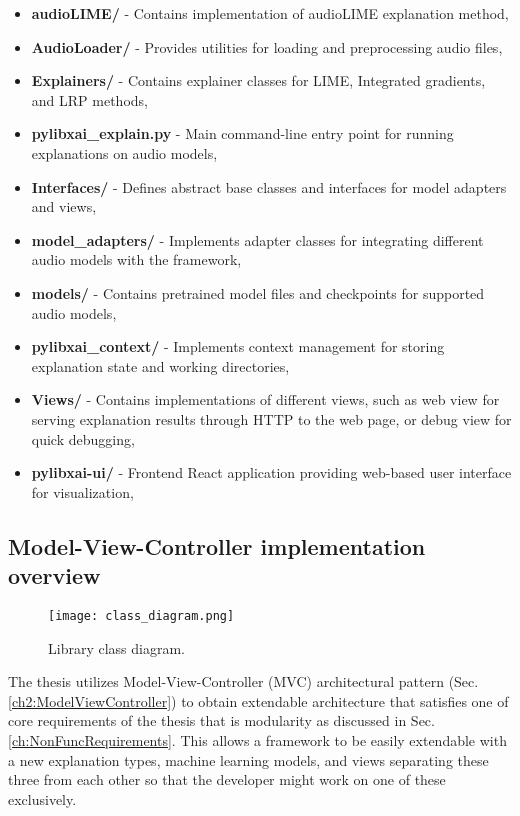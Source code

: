 \documentclass[
    bindingoffset=5mm,  %
    footnoteindent=3mm, %
    hyphenation=true    %
]{src/wut-thesis}
\begin{document}
\begin{itemize}[itemsep=1\baselineskip]
	\item \textbf{audioLIME/} - Contains implementation of audioLIME explanation method,
	\item \textbf{AudioLoader/} - Provides utilities for loading and preprocessing audio files,
	\item \textbf{Explainers/} - Contains explainer classes for LIME, Integrated gradients, and LRP methods,
	\item \textbf{pylibxai\_explain.py} - Main command-line entry point for running explanations on audio models,
	\item \textbf{Interfaces/} - Defines abstract base classes and interfaces for model adapters and views,
	\item \textbf{model\_adapters/} - Implements adapter classes for integrating different audio models with the framework,
	\item \textbf{models/} - Contains pretrained model files and checkpoints for supported audio models,
	\item \textbf{pylibxai\_context/} - Implements context management for storing explanation state and working directories,
	\item \textbf{Views/} - Contains implementations of different views, such as web view for serving explanation results through HTTP to the web page, or debug view for quick debugging,
	\item \textbf{pylibxai-ui/} - Frontend React application providing web-based user interface for visualization,
\end{itemize}

\subsection{Model-View-Controller implementation overview}

\begin{figure}%
    \centering
    \texttt{[image: class\_diagram.png]}
    \caption{Library class diagram.}
    \label{fig:ClassDiagram}
\end{figure}

    The thesis utilizes Model-View-Controller (MVC) architectural pattern (Sec. \ref{ch2:ModelViewController}) to obtain extendable architecture that satisfies one of core requirements of the thesis that is modularity as discussed in Sec. \ref{ch:NonFuncRequirements}. This allows a framework to be easily extendable with a new explanation types, machine learning models, and views separating these three from each other so that the developer might work on one of these exclusively.
\end{document}
